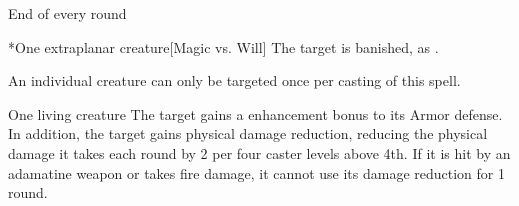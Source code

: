 \begin{spellheader}
    \spellrng{\rngmed}
\end{spellheader}
\begin{spelleffects}
    \begin{spelltrigger}{End of every round}
        \begin{spelltarget}*{One extraplanar creature}[Magic vs. Will]
            \spellsuccess The target is banished, as .
        \end{spelltarget}
    \end{spelltrigger}
    \spelleffect An individual creature can only be targeted once per casting of this spell.
\end{spelleffects}
\begin{spellfooter}
    
\end{spellfooter}

\begin{spellheader}
    \spelldur{\durshort}
\end{spellheader}
\begin{spelleffects}
    \begin{spelltarget}{One living creature}
        \spelleffect The target gains a  enhancement bonus to its Armor defense. \spellbonusscalingdescription In addition, the target gains physical damage reduction, reducing the physical damage it takes each round by 2  per four caster levels above 4th. If it is hit by an adamatine weapon or takes fire damage, it cannot use its damage reduction for 1 round.
    \end{spelltarget}
\end{spelleffects}
\begin{spellfooter}
    
\end{spellfooter}

